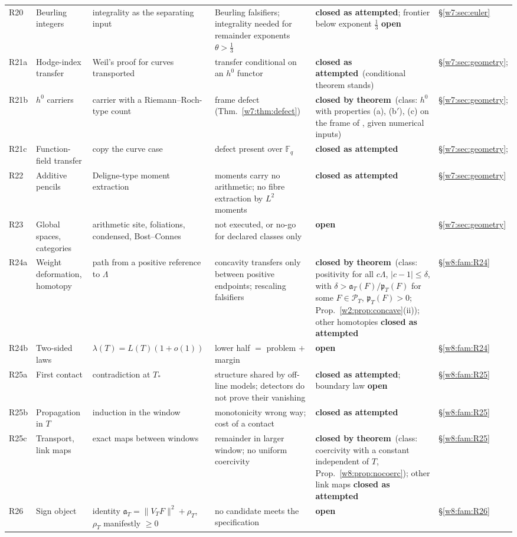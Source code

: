 \documentclass[11pt]{amsart}
\theoremstyle{definition}
\theoremstyle{remark}
\numberwithin{equation}{section}
\newcommand{\PT}{\mathcal{P}_T}                        %
\newcommand{\pT}{\mathfrak{p}_T}                       %
\newcommand{\aT}{\mathfrak{a}_T}                       %
\newcommand{\lam}{\lambda(T)}                          %
\newcommand{\Tst}{T_{*}}                               %
\newcommand{\rtag}[1]{\textbf{\small\textsf{#1}}}
\newcommand{\closedT}{\rtag{closed by theorem}}
\newcommand{\closedA}{\rtag{closed as attempted}}
\newcommand{\openR}{\rtag{open}}
\begin{document}
{\begin{longtable}{>{\raggedright}p{0.9cm}>{\raggedright}p{2.6cm}>{\raggedright}p{3.2cm}>{\raggedright}p{3.6cm}>{\raggedright}p{2.4cm}>{\raggedright\arraybackslash}p{1.9cm}}
R20 & Beurling integers & integrality as the separating input & Beurling falsifiers; integrality needed for remainder exponents $\theta>\frac13$ & \closedA; frontier below exponent $\frac13$ \openR & \S\ref{w7:sec:euler}\\
R21a & Hodge-index transfer & Weil's proof for curves transported & transfer conditional on an $h^0$ functor & \closedA\ (conditional theorem stands) & \S\ref{w7:sec:geometry}; \cite{P47}\\
R21b & $h^0$ carriers & carrier with a Riemann--Roch-type count & frame defect (Thm.~\ref{w7:thm:defect}) & \closedT\ (class: $h^0$ with properties (a), (b$'$), (c) on the frame of \cite{P47}, given numerical inputs) & \S\ref{w7:sec:geometry}; \cite{P47}\\
R21c & Function-field transfer & copy the curve case & defect present over $\mathbb F_q$ & \closedA & \S\ref{w7:sec:geometry}; \cite{P47}\\
R22 & Additive pencils & Deligne-type moment extraction & moments carry no arithmetic; no fibre extraction by $L^2$ moments & \closedA & \S\ref{w7:sec:geometry}\\
R23 & Global spaces, categories & arithmetic site, foliations, condensed, Bost--Connes & not executed, or no-go for declared classes only & \openR & \S\ref{w7:sec:geometry}\\
R24a & Weight deformation, homotopy & path from a positive reference to $\Lambda$ & concavity transfers only between positive endpoints; rescaling falsifiers & \closedT\ (class: positivity for all $c\Lambda$, $|c-1|\le\delta$, with $\delta>\aT(F)/\pT(F)$ for some $F\in\PT$, $\pT(F)>0$; Prop.~\ref{w2:prop:concave}(ii)); other homotopies \closedA & \S\ref{w8:fam:R24}\\
R24b & Two-sided laws & $\lam=L(T)(1+o(1))$ & lower half $=$ problem $+$ margin & \openR & \S\ref{w8:fam:R24}\\
R25a & First contact & contradiction at $\Tst$ & structure shared by off-line models; detectors do not prove their vanishing & \closedA; boundary law \openR & \S\ref{w8:fam:R25}\\
R25b & Propagation in $T$ & induction in the window & monotonicity wrong way; cost of a contact & \closedA & \S\ref{w8:fam:R25}\\
R25c & Transport, link maps & exact maps between windows & remainder in larger window; no uniform coercivity & \closedT\ (class: coercivity with a constant independent of $T$, Prop.~\ref{w8:prop:nocoerc}); other link maps \closedA & \S\ref{w8:fam:R25}\\
R26 & Sign object & identity $\aT=\|V_TF\|^2+\rho_T$, $\rho_T$ manifestly $\ge0$ & no candidate meets the specification & \openR & \S\ref{w8:fam:R26}\\
\end{longtable}
}
\end{document}
